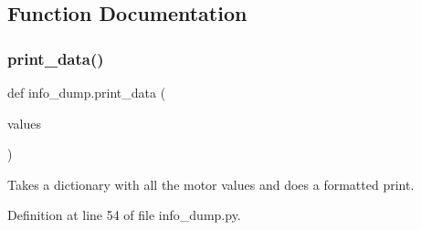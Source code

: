 \subsection{Function Documentation}
\mbox{\label{namespaceinfo__dump_ac13e616852fd9e21cf91c62bd7c6ba7c}} 
\subsubsection{\texorpdfstring{print\+\_\+data()}{print\_data()}}
{\footnotesize\ttfamily def info\+\_\+dump.\+print\+\_\+data (\begin{DoxyParamCaption}\item[{}]{values }\end{DoxyParamCaption})}

\begin{DoxyVerb}Takes a dictionary with all the motor values and does a formatted print.
\end{DoxyVerb}
 

Definition at line 54 of file info\+\_\+dump.\+py.


